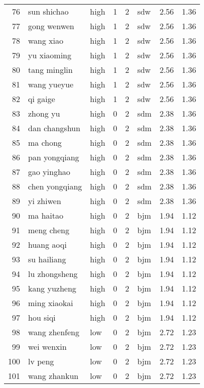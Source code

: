 \begin{table}[ht]
\begin{tabular}{rllrrlrr}
  76 & sun shichao & high &   1 &   2 & sdw & 2.56 & 1.36 \\ 
  77 & gong wenwen & high &   1 &   2 & sdw & 2.56 & 1.36 \\ 
  78 & wang xiao & high &   1 &   2 & sdw & 2.56 & 1.36 \\ 
  79 & yu xiaoming & high &   1 &   2 & sdw & 2.56 & 1.36 \\ 
  80 & tang minglin & high &   1 &   2 & sdw & 2.56 & 1.36 \\ 
  81 & wang yueyue & high &   1 &   2 & sdw & 2.56 & 1.36 \\ 
  82 & qi gaige & high &   1 &   2 & sdw & 2.56 & 1.36 \\ 
  83 & zhong yu & high &   0 &   2 & sdm & 2.38 & 1.36 \\ 
  84 & dan changshun & high &   0 &   2 & sdm & 2.38 & 1.36 \\ 
  85 & ma chong & high &   0 &   2 & sdm & 2.38 & 1.36 \\ 
  86 & pan yongqiang & high &   0 &   2 & sdm & 2.38 & 1.36 \\ 
  87 & gao yinghao & high &   0 &   2 & sdm & 2.38 & 1.36 \\ 
  88 & chen yongqiang & high &   0 &   2 & sdm & 2.38 & 1.36 \\ 
  89 & yi zhiwen & high &   0 &   2 & sdm & 2.38 & 1.36 \\ 
  90 & ma haitao & high &   0 &   2 & bjm & 1.94 & 1.12 \\ 
  91 & meng cheng & high &   0 &   2 & bjm & 1.94 & 1.12 \\ 
  92 & huang aoqi & high &   0 &   2 & bjm & 1.94 & 1.12 \\ 
  93 & su hailiang & high &   0 &   2 & bjm & 1.94 & 1.12 \\ 
  94 & lu zhongsheng & high &   0 &   2 & bjm & 1.94 & 1.12 \\ 
  95 & kang yuzheng & high &   0 &   2 & bjm & 1.94 & 1.12 \\ 
  96 & ming xiaokai & high &   0 &   2 & bjm & 1.94 & 1.12 \\ 
  97 & hou siqi & high &   0 &   2 & bjm & 1.94 & 1.12 \\ 
  98 & wang zhenfeng & low &   0 &   2 & bjm & 2.72 & 1.23 \\ 
  99 & wei wenxin & low &   0 &   2 & bjm & 2.72 & 1.23 \\ 
  100 & lv peng & low &   0 &   2 & bjm & 2.72 & 1.23 \\ 
  101 & wang zhankun & low &   0 &   2 & bjm & 2.72 & 1.23 \\ 

\end{tabular}
\end{table}
